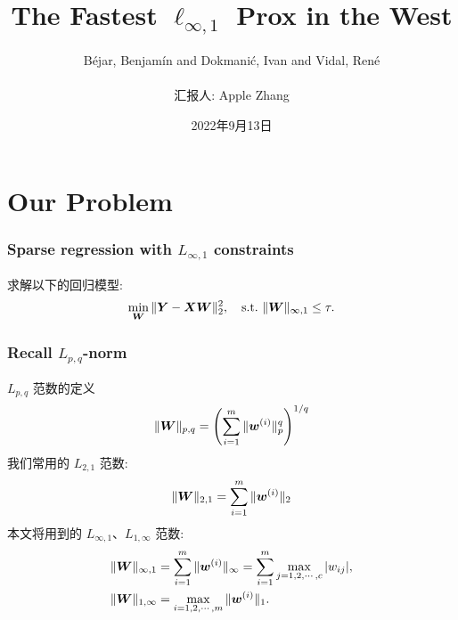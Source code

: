 \documentclass{beamer}
\begin{document}
    \title[KKT, prox, projection]{The Fastest $\ell_{\infty,1}$ Prox in the West}
    \author[Apple Zhang]{B\'ejar, Benjam\'in and Dokmani\'c, Ivan and Vidal, Ren\'e\\~\\\small 汇报人: Apple Zhang} %
    \date{2022年9月13日}  %
\begin{frame}
    \titlepage
\end{frame}

\section[目录]{}
\frame {
    \frametitle{\secname}
    \tableofcontents
}


\section{Our Problem}

\begin{frame}[fragile]
    \frametitle{Sparse regression with $L_{\infty,1}$ constraints}
    求解以下的回归模型\cite{L1infprox}:
    \begin{align}
        \min_{{\bm W}}\|{\bm Y}-{\bm X}{\bm W}\|_2^2,\quad\mathrm{s.t.}~\|{\bm W}\|_{\infty,1}\leq\tau.
    \end{align}
\end{frame}

\begin{frame}[fragile]
    \frametitle{Recall $L_{p,q}$-norm}
    $L_{p,q}$ 范数的定义
    \begin{equation}
        \|{\bm W}\|_{p,q}=\left(\sum_{i=1}^m\|{\bm w}^{(i)}\|_p^q\right)^{1/q}
    \end{equation}
    我们常用的 $L_{2,1}$ 范数:
    \begin{equation}
        \|{\bm W}\|_{2,1}=\sum_{i=1}^m\|{\bm w}^{(i)}\|_2
    \end{equation}
    本文将用到的 $L_{\infty,1}$、$L_{1,\infty}$ 范数:
    \begin{align}
        &\|{\bm W}\|_{\infty,1}=\sum_{i=1}^m\|{\bm w}^{(i)}\|_\infty=\sum_{i=1}^m\max_{j=1,2,\cdots,c}|w_{ij}|,\\
        &\|{\bm W}\|_{1,\infty}=\max_{i=1,2,\cdots,m}\|{\bm w}^{(i)}\|_1.
    \end{align}
\end{frame}
\end{document}
